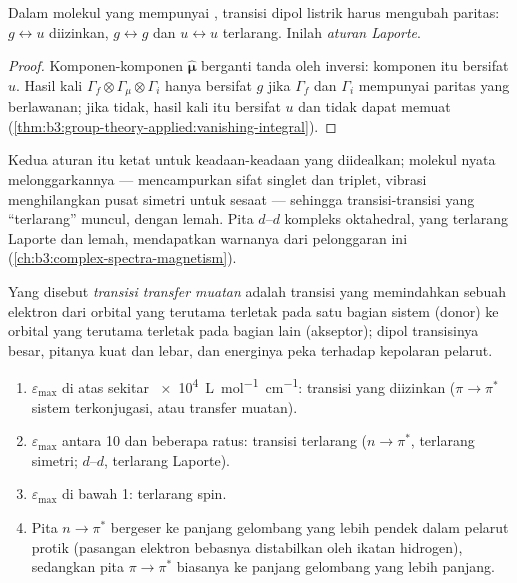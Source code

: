 \begin{theorem}\label{thm:b3:electronic-spectroscopy:laporte}
Dalam molekul yang mempunyai , transisi dipol listrik harus
mengubah paritas: $g \leftrightarrow u$ diizinkan, $g \leftrightarrow g$ dan $u
\leftrightarrow u$ terlarang. Inilah \emph{aturan Laporte}.
\end{theorem}

\begin{proof}
Komponen-komponen $\hat{\boldsymbol\mu}$ berganti tanda oleh inversi: komponen
itu bersifat $u$. Hasil kali $\Gamma_f\otimes\Gamma_\mu\otimes\Gamma_i$ hanya bersifat
$g$ jika $\Gamma_f$ dan $\Gamma_i$ mempunyai paritas yang berlawanan; jika tidak,
hasil kali itu bersifat $u$ dan tidak dapat memuat 
(\cref{thm:b3:group-theory-applied:vanishing-integral}).
\end{proof}

Kedua aturan itu ketat untuk keadaan-keadaan yang diidealkan; molekul nyata
melonggarkannya ---  mencampurkan sifat singlet dan triplet,
vibrasi menghilangkan pusat simetri untuk sesaat --- sehingga transisi-transisi
yang ``terlarang'' muncul, dengan lemah. Pita $d$--$d$ kompleks oktahedral,
yang terlarang Laporte dan lemah, mendapatkan warnanya dari pelonggaran ini
(\cref{ch:b3:complex-spectra-magnetism}).

\begin{definition}\label{def:b3:electronic-spectroscopy:charge-transfer}
Yang disebut \emph{transisi transfer muatan}
adalah transisi yang memindahkan sebuah elektron dari orbital yang terutama
terletak pada satu bagian sistem (donor) ke orbital yang terutama terletak
pada bagian lain (akseptor); dipol transisinya besar, pitanya kuat dan lebar,
dan energinya peka terhadap kepolaran pelarut.
\end{definition}

\begin{method}\label{met:b3:electronic-spectroscopy:assign-band}
\begin{enumerate}
  \item $\varepsilon_{\max}$ di atas sekitar \qty{e4}{L.mol^{-1}.cm^{-1}}: transisi
        yang diizinkan ($\pi\to\pi^*$ sistem terkonjugasi, atau transfer muatan).
  \item $\varepsilon_{\max}$ antara 10 dan beberapa ratus: transisi terlarang
        ($n\to\pi^*$, terlarang simetri; $d$--$d$, terlarang Laporte).
  \item $\varepsilon_{\max}$ di bawah 1: terlarang spin.
  \item Pita $n\to\pi^*$ bergeser ke panjang gelombang yang lebih pendek dalam
        pelarut protik (pasangan elektron bebasnya distabilkan oleh ikatan
        hidrogen), sedangkan pita $\pi\to\pi^*$ biasanya ke panjang gelombang
        yang lebih panjang.
\end{enumerate}
\end{method}

